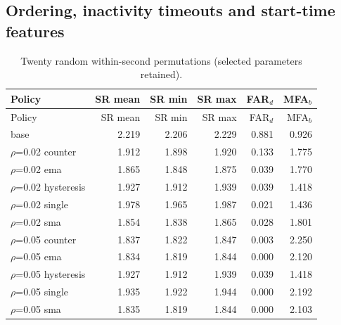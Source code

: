 \subsection{Ordering, inactivity timeouts and start-time features}
{\footnotesize\setlength{\tabcolsep}{4pt}
\begin{longtable}{lrrrrr}
\caption{Twenty random within-second permutations (selected parameters retained).}\label{tab:s7_ties}\\
\toprule
Policy & SR mean & SR min & SR max & FAR$_d$ & MFA$_b$\\
\midrule
\endfirsthead
\toprule
Policy & SR mean & SR min & SR max & FAR$_d$ & MFA$_b$\\
\midrule
\endhead
\bottomrule
\endfoot
base & 2.219 & 2.206 & 2.229 & 0.881 & 0.926\\
$\rho$=0.02 counter & 1.912 & 1.898 & 1.920 & 0.133 & 1.775\\
$\rho$=0.02 ema & 1.865 & 1.848 & 1.875 & 0.039 & 1.770\\
$\rho$=0.02 hysteresis & 1.927 & 1.912 & 1.939 & 0.039 & 1.418\\
$\rho$=0.02 single & 1.978 & 1.965 & 1.987 & 0.021 & 1.436\\
$\rho$=0.02 sma & 1.854 & 1.838 & 1.865 & 0.028 & 1.801\\
$\rho$=0.05 counter & 1.837 & 1.822 & 1.847 & 0.003 & 2.250\\
$\rho$=0.05 ema & 1.834 & 1.819 & 1.844 & 0.000 & 2.120\\
$\rho$=0.05 hysteresis & 1.927 & 1.912 & 1.939 & 0.039 & 1.418\\
$\rho$=0.05 single & 1.935 & 1.922 & 1.944 & 0.000 & 2.192\\
$\rho$=0.05 sma & 1.835 & 1.819 & 1.844 & 0.000 & 2.103\\
\end{longtable}}
